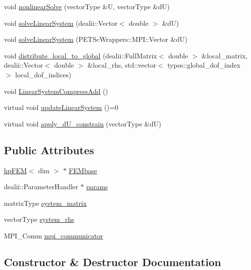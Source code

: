 \begin{DoxyCompactItemize}
\item 
void \hyperlink{classsolve_class_a9240f8777a918e2c20e57857e4b6b97e}{nonlinear\-Solve} (vector\-Type \&U, vector\-Type \&d\-U)
\item 
void \hyperlink{classsolve_class_a922f231ca16d84f2d3253c0d497f2448}{solve\-Linear\-System} (dealii\-::\-Vector$<$ double $>$ \&d\-U)
\item 
void \hyperlink{classsolve_class_a31c22340527a596f8d6aeeea60ffe52a}{solve\-Linear\-System} (P\-E\-T\-Sc\-Wrappers\-::\-M\-P\-I\-::\-Vector \&d\-U)
\item 
void \hyperlink{classsolve_class_af9e8a3e1a38280c43f242bbeb7139f00}{distribute\-\_\-local\-\_\-to\-\_\-global} (dealii\-::\-Full\-Matrix$<$ double $>$ \&local\-\_\-matrix, dealii\-::\-Vector$<$ double $>$ \&local\-\_\-rhs, std\-::vector$<$ types\-::global\-\_\-dof\-\_\-index $>$ local\-\_\-dof\-\_\-indices)
\item 
void \hyperlink{classsolve_class_ad7659997bee5e782a6eaa46db001b66a}{Linear\-System\-Compress\-Add} ()
\item 
virtual void \hyperlink{classsolve_class_ac26f13764de7ae2dceb36ad98428a485}{update\-Linear\-System} ()=0
\item 
virtual void \hyperlink{classsolve_class_a029ece57f667fa697cb29eb482eff31b}{apply\-\_\-d\-U\-\_\-constrain} (vector\-Type \&d\-U)
\end{DoxyCompactItemize}
\subsection*{Public Attributes}
\begin{DoxyCompactItemize}
\item 
\hyperlink{classhp_f_e_m}{hp\-F\-E\-M}$<$ dim $>$ $\ast$ \hyperlink{classsolve_class_a46118a342b07ce7167bb0c9358de84f1}{F\-E\-Mbase}
\item 
dealii\-::\-Parameter\-Handler $\ast$ \hyperlink{classsolve_class_accca5aede13ea52f0c11dff4daf1ad97}{params}
\item 
matrix\-Type \hyperlink{classsolve_class_a56f7357eb335f9ce4ac30bc30d7513e8}{system\-\_\-matrix}
\item 
vector\-Type \hyperlink{classsolve_class_a6c39fa839fdc40d2408946617a778571}{system\-\_\-rhs}
\item 
M\-P\-I\-\_\-\-Comm \hyperlink{classsolve_class_a03728ed636ca889ae407c84d181bc611}{mpi\-\_\-communicator}
\end{DoxyCompactItemize}


\subsection{Constructor \& Destructor Documentation}
